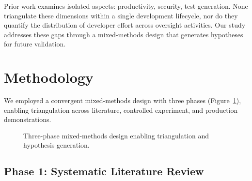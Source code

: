 \documentclass[sigconf]{acmart}
\begin{document}
Prior work examines isolated aspects: productivity, security, test generation. None triangulate these dimensions within a single development lifecycle, nor do they quantify the distribution of developer effort across oversight activities. Our study addresses these gaps through a mixed-methods design that generates hypotheses for future validation.

\section{Methodology}

We employed a convergent mixed-methods design with three phases (Figure~\ref{fig:design}), enabling triangulation across literature, controlled experiment, and production demonstrations.

\begin{figure}[htbp]
\centering
{}
\caption{Three-phase mixed-methods design enabling triangulation and hypothesis generation.}
\label{fig:design}
\end{figure}

\subsection{Phase 1: Systematic Literature Review}
\end{document}
